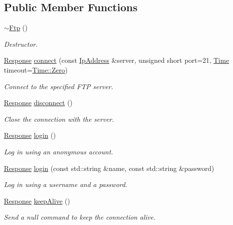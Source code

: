 \subsection*{Public Member Functions}
\begin{DoxyCompactItemize}
\item 
\hyperlink{classsf_1_1Ftp_a2edfa8e9009caf27bce74459ae76dc52}{$\sim$\-Ftp} ()
\begin{DoxyCompactList}\small\item\em Destructor. \end{DoxyCompactList}\item 
\hyperlink{classsf_1_1Ftp_1_1Response}{Response} \hyperlink{classsf_1_1Ftp_af02fb3de3f450a50a27981961c69c860}{connect} (const \hyperlink{classsf_1_1IpAddress}{Ip\-Address} \&server, unsigned short port=21, \hyperlink{classsf_1_1Time}{Time} timeout=\hyperlink{classsf_1_1Time_a8db127b632fa8da21550e7282af11fa0}{Time\-::\-Zero})
\begin{DoxyCompactList}\small\item\em Connect to the specified F\-T\-P server. \end{DoxyCompactList}\item 
\hyperlink{classsf_1_1Ftp_1_1Response}{Response} \hyperlink{classsf_1_1Ftp_acf7459926f3391cd06bf84337ed6a0f4}{disconnect} ()
\begin{DoxyCompactList}\small\item\em Close the connection with the server. \end{DoxyCompactList}\item 
\hyperlink{classsf_1_1Ftp_1_1Response}{Response} \hyperlink{classsf_1_1Ftp_a686262bc377584cd50e52e1576aa3a9b}{login} ()
\begin{DoxyCompactList}\small\item\em Log in using an anonymous account. \end{DoxyCompactList}\item 
\hyperlink{classsf_1_1Ftp_1_1Response}{Response} \hyperlink{classsf_1_1Ftp_a99d8114793c1659e9d51d45cecdcd965}{login} (const std\-::string \&name, const std\-::string \&password)
\begin{DoxyCompactList}\small\item\em Log in using a username and a password. \end{DoxyCompactList}\item 
\hyperlink{classsf_1_1Ftp_1_1Response}{Response} \hyperlink{classsf_1_1Ftp_aa1127d442b4acb2105aa8060a39d04fc}{keep\-Alive} ()
\begin{DoxyCompactList}\small\item\em Send a null command to keep the connection alive. \end{DoxyCompactList}\item 

\end{DoxyCompactItemize}
